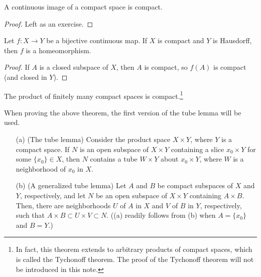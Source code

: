 \begin{prop}
    A continuous image of a compact space is compact.
\end{prop}
\begin{proof}
    \color{brown}Left as an exercise.\color{black}
\end{proof}

\begin{prop}
    Let $f: X\rightarrow Y$ be a bijective continuous map.
    If $X$ is compact and $Y$ is Hausdorff, then $f$ is a homeomorphism.
\end{prop}
\begin{proof}
    If $A$ is a closed subspace of $X$, then $A$ is compact, so $f(A)$ is compact (and closed in $Y$).
\end{proof}

\begin{thm}\label{products of compact spaces}
    The product of finitely many compact spaces is compact.\footnote{In fact, this theorem extends to arbitrary products of compact spaces, which is called the Tychonoff theorem.
    The proof of the Tychonoff theorem will not be introduced in this note.}
\end{thm}
When proving the above theorem, the first version of the tube lemma will be used.
\begin{lem}\label{tube lemmas}
    \begin{enumerate}
        \item[(a)]
        {
            (The tube lemma)
            Consider the product space $X\times Y$, where $Y$ is a compact space.
            If $N$ is an open subspace of $X\times Y$ containing a slice $x_0\times Y$ for some $\{x_0\}\in X$, then $N$ contains a tube $W\times Y$ about $x_0\times Y$, where $W$ is a neighborhood of $x_0$ in $X$.
        }
        \item[(b)]
        {
            (A generalized tube lemma)
            Let $A$ and $B$ be compact subspaces of $X$ and $Y$, respectively, and let $N$ be an open subspace of $X\times Y$ containing $A\times B$.
            Then, there are neighborhoods $U$ of $A$ in $X$ and $V$ of $B$ in $Y$, respectively, such that $A\times B\subset U\times V\subset N$.
            ((a) readily follows from (b) when $A=\{x_0\}$ and $B=Y$.)
        }
    \end{enumerate}
\end{lem}
